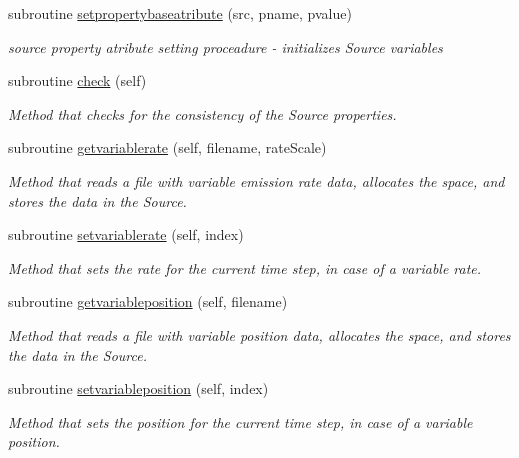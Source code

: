 \begin{DoxyCompactItemize}
subroutine \mbox{\hyperlink{namespacesources__mod_ac486d29030348958c06dfebd8ddc0d5e}{setpropertybaseatribute}} (src, pname, pvalue)
\begin{DoxyCompactList}\small\item\em source property atribute setting proceadure -\/ initializes Source variables \end{DoxyCompactList}\item 
subroutine \mbox{\hyperlink{namespacesources__mod_a6fcfcb690cd1b9375915b01f7ddbe801}{check}} (self)
\begin{DoxyCompactList}\small\item\em Method that checks for the consistency of the Source properties. \end{DoxyCompactList}\item 
subroutine \mbox{\hyperlink{namespacesources__mod_a66fda4b5042b49bb82d085166c06fcb9}{getvariablerate}} (self, filename, rate\+Scale)
\begin{DoxyCompactList}\small\item\em Method that reads a file with variable emission rate data, allocates the space, and stores the data in the Source. \end{DoxyCompactList}\item 
subroutine \mbox{\hyperlink{namespacesources__mod_a2777c01e39726d0acdafa7dabd8c1a6d}{setvariablerate}} (self, index)
\begin{DoxyCompactList}\small\item\em Method that sets the rate for the current time step, in case of a variable rate. \end{DoxyCompactList}\item 
subroutine \mbox{\hyperlink{namespacesources__mod_a1d419dd3048cff4cba05de4dd05b6556}{getvariableposition}} (self, filename)
\begin{DoxyCompactList}\small\item\em Method that reads a file with variable position data, allocates the space, and stores the data in the Source. \end{DoxyCompactList}\item 
subroutine \mbox{\hyperlink{namespacesources__mod_ace7df80935a9daf416ecebad865f6b69}{setvariableposition}} (self, index)
\begin{DoxyCompactList}\small\item\em Method that sets the position for the current time step, in case of a variable position. \end{DoxyCompactList}\item 

\end{DoxyCompactItemize}
